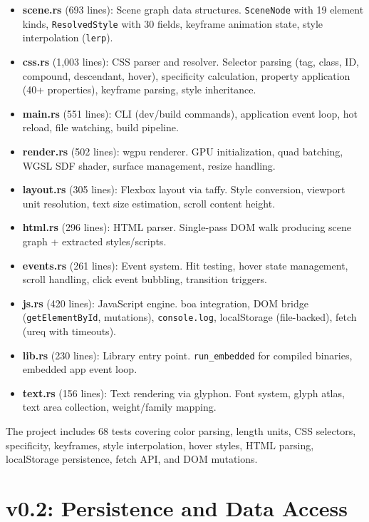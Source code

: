 \documentclass[11pt,twocolumn]{article}
\begin{document}
\begin{itemize}
\item \textbf{scene.rs} (693 lines): Scene graph data structures. \texttt{SceneNode} with 19 element kinds, \texttt{ResolvedStyle} with 30 fields, keyframe animation state, style interpolation (\texttt{lerp}).
\item \textbf{css.rs} (1,003 lines): CSS parser and resolver. Selector parsing (tag, class, ID, compound, descendant, hover), specificity calculation, property application (40+ properties), keyframe parsing, style inheritance.
\item \textbf{main.rs} (551 lines): CLI (dev/build commands), application event loop, hot reload, file watching, build pipeline.
\item \textbf{render.rs} (502 lines): wgpu renderer. GPU initialization, quad batching, WGSL SDF shader, surface management, resize handling.
\item \textbf{layout.rs} (305 lines): Flexbox layout via taffy. Style conversion, viewport unit resolution, text size estimation, scroll content height.
\item \textbf{html.rs} (296 lines): HTML parser. Single-pass DOM walk producing scene graph + extracted styles/scripts.
\item \textbf{events.rs} (261 lines): Event system. Hit testing, hover state management, scroll handling, click event bubbling, transition triggers.
\item \textbf{js.rs} (420 lines): JavaScript engine. boa integration, DOM bridge (\texttt{getElementById}, mutations), \texttt{console.log}, localStorage (file-backed), fetch (ureq with timeouts).
\item \textbf{lib.rs} (230 lines): Library entry point. \texttt{run\_embedded} for compiled binaries, embedded app event loop.
\item \textbf{text.rs} (156 lines): Text rendering via glyphon. Font system, glyph atlas, text area collection, weight/family mapping.
\end{itemize}

The project includes 68 tests covering color parsing, length units, CSS selectors, specificity, keyframes, style interpolation, hover styles, HTML parsing, localStorage persistence, fetch API, and DOM mutations.

\section{v0.2: Persistence and Data Access}
\end{document}
